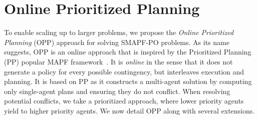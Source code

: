 \documentclass[letterpaper]{article} %
\newcommand{\plan}[1]{{\textcolor{blue}{[Plan: #1]}}}
\newcommand{\inon}[1]{ }
\newcommand{\roni}[1]{ }
\begin{document}




\section{Online Prioritized Planning}
\label{sec:online}



To enable scaling up to larger problems, we propose the \emph{Online Prioritized Planning} (OPP) approach for solving SMAPF-PO problems.
As its name suggests, OPP is an online approach that is inspired by the Prioritized Planning (PP) popular MAPF framework~\cite{silver2005cooperative}.
It is \emph{online} in the sense that it does not generate a policy for every possible contingency, but interleaves execution and planning.
It is based on PP as it constructs a multi-agent solution by computing only single-agent plans
and ensuring they do not conflict. When resolving potential conflicts, we take a prioritized approach, where lower priority agents yield to higher priority agents.
We now detail OPP along with several extensions.
\end{document}
